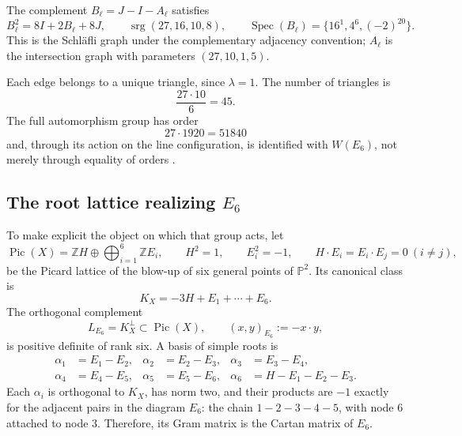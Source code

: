 The complement \(B_\ell=J-I-A_\ell\) satisfies
\begin{equation}
 B_\ell^2=8I+2B_\ell+8J,
 \qquad
 \operatorname{srg}(27,16,10,8),
 \qquad
 \operatorname{Spec}(B_\ell)=\{16^1,4^6,(-2)^{20}\}.
 \label{p12-83-c20-s6:eq:complemento-schlafli}
\end{equation}
This is the Schläfli graph under the complementary adjacency convention;
\(A_\ell\) is the intersection graph with parameters
\((27,10,1,5)\).

Each edge belongs to a unique triangle, since \(\lambda=1\). The number
of triangles is
\[
 \frac{27\cdot10}{6}=45.
\]
The full automorphism group has order
\[
 27\cdot1920=51840
\]
and, through its action on the line configuration, is identified with
\(W(E_6)\), not merely through equality of orders \cite{Manivel2005}.

\subsection{The root lattice realizing \texorpdfstring{\(E_6\)}{E6}}

To make explicit the object on which that group acts, let
\begin{equation}
 \operatorname{Pic}(X)
 =\mathbb ZH\oplus\bigoplus_{i=1}^6\mathbb ZE_i,
 \qquad
 H^2=1,\qquad E_i^2=-1,\qquad H\cdot E_i=E_i\cdot E_j=0\ (i\ne j),
 \label{p12-83-c20-s6:eq:picard-cubica-e6}
\end{equation}
be the Picard lattice of the blow-up of six general points of
\(\mathbb P^2\). Its canonical class is
\[
 K_X=-3H+E_1+\cdots+E_6.
\]
The orthogonal complement
\begin{equation}
 L_{E_6}=K_X^\perp\subset\operatorname{Pic}(X),
 \qquad (x,y)_{E_6}:=-x\cdot y,
 \label{p12-83-c20-s6:eq:reticulo-raices-e6}
\end{equation}
is positive definite of rank six. A basis of simple roots is
\begin{equation}
 \begin{aligned}
 \alpha_1&=E_1-E_2,& \alpha_2&=E_2-E_3,&
 \alpha_3&=E_3-E_4,\\
 \alpha_4&=E_4-E_5,& \alpha_5&=E_5-E_6,&
 \alpha_6&=H-E_1-E_2-E_3.
 \end{aligned}
 \label{p12-83-c20-s6:eq:raices-simples-e6}
\end{equation}
Each \(\alpha_i\) is orthogonal to \(K_X\), has norm two, and their products
are \(-1\) exactly for the adjacent pairs in the diagram
\(E_6\): the chain \(1-2-3-4-5\), with node \(6\) attached to node \(3\).
Therefore, its Gram matrix is the Cartan matrix of \(E_6\).

